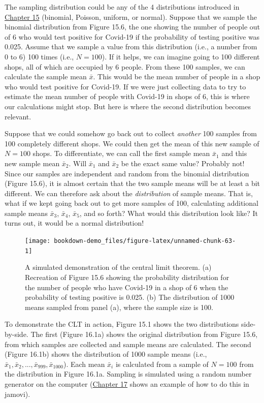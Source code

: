 \documentclass[
]{scrbook}
\begin{document}
The sampling distribution could be any of the 4 distributions introduced in \protect\hyperlink{Chapter_15}{Chapter 15} (binomial, Poisson, uniform, or normal).
Suppose that we sample the binomial distribution from Figure 15.6, the one showing the number of people out of 6 who would test positive for Covid-19 if the probability of testing positive was 0.025.
Assume that we sample a value from this distribution (i.e., a number from 0 to 6) 100 times (i.e., \(N = 100\)).
If it helps, we can imagine going to 100 different shops, all of which are occupied by 6 people.
From these 100 samples, we can calculate the sample mean \(\bar{x}\).
This would be the mean number of people in a shop who would test positive for Covid-19.
If we were just collecting data to try to estimate the mean number of people with Covid-19 in shops of 6, this is where our calculations might stop.
But here is where the second distribution becomes relevant.

Suppose that we could somehow go back out to collect \emph{another} 100 samples from 100 completely different shops.
We could then get the mean of this new sample of \(N = 100\) shops.
To differentiate, we can call the first sample mean \(\bar{x}_{1}\) and this new sample mean \(\bar{x}_{2}\).
Will \(\bar{x}_{1}\) and \(\bar{x}_{2}\) be the exact same value?
Probably not!
Since our samples are independent and random from the binomial distribution (Figure 15.6), it is almost certain that the two sample means will be at least a bit different.
We can therefore ask about the \emph{distribution} of sample means.
That is, what if we kept going back out to get more samples of 100, calculating additional sample means \(\bar{x}_{3}\), \(\bar{x}_{4}\), \(\bar{x}_{5}\), and so forth?
What would this distribution look like?
It turns out, it would be a normal distribution!

\begin{figure}
\texttt{[image: bookdown-demo\_files/figure-latex/unnamed-chunk-63-1]} \caption{A simulated demonstration of the central limit theorem. (a) Recreation of Figure 15.6 showing the probability distribution for the number of people who have Covid-19 in a shop of 6 when the probability of testing positive is 0.025. (b) The distribution of 1000 means sampled from panel (a), where the sample size is 100.}\label{fig:unnamed-chunk-63}
\end{figure}

To demonstrate the CLT in action, Figure 15.1 shows the two distributions side-by-side.
The first (Figure 16.1a) shows the original distribution from Figure 15.6, from which samples are collected and sample means are calculated.
The second (Figure 16.1b) shows the distribution of 1000 sample means (i.e., \(\bar{x}_{1}, \bar{x}_{2}, ..., \bar{x}_{999}, \bar{x}_{1000}\)).
Each mean \(\bar{x}_{i}\) is calculated from a sample of \(N = 100\) from the distribution in Figure 16.1a.
Sampling is simulated using a random number generator on the computer (\protect\hyperlink{Chapter_17}{Chapter 17} shows an example of how to do this in jamovi).
\end{document}
